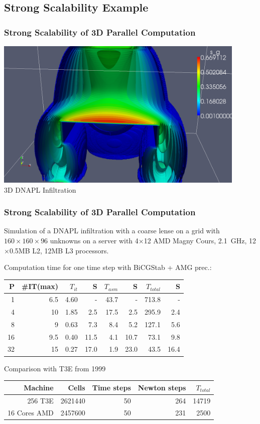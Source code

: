 \documentclass[aspectratio=169,11pt]{beamer}
\theoremstyle{definition}
\begin{document}
\subsection{Strong Scalability Example}
\begin{frame}
\frametitle<presentation>{Strong Scalability of 3D Parallel Computation}
\begin{center}
\includegraphics[width=0.9\textwidth]{dnapl-3d-het-iso}\\
3D DNAPL Infiltration
\end{center}
\end{frame}


\begin{frame}
\frametitle<presentation>{Strong Scalability of 3D Parallel Computation}
Simulation of a DNAPL infiltration with a coarse lense on a grid with  $160 \times 160 \times 96$
unknowns on a server with 4$\times$12  AMD Magny Cours, 2.1~GHz, 12$\times$0.5MB L2, 12MB
L3 processors.

Computation time for one time step with BiCGStab + AMG prec.:
\begin{center}
\begin{tabular}{r|rrr|rr|rr}
\hline
P  & \#IT(max) & $T_{it}$ & S & $T_{asm}$ & S & $T_{total}$ & S \\
\hline
 1  &  6.5 & 4.60 &      - &  43.7 &      - & 713.8 &    - \\
 4  &  10  & 1.85 &   2.5 &  17.5 &   2.5 & 295.9 & 2.4 \\
 8  &  9    & 0.63 &   7.3 &    8.4 &   5.2 & 127.1 & 5.6 \\
16 &  9.5 & 0.40 & 11.5 &    4.1 & 10.7 &   73.1 & 9.8 \\
32 &  15  & 0.27 & 17.0 &    1.9 & 23.0 &   43.5 & 16.4 \\
\hline
\end{tabular}
\end{center}

Comparison with T3E from 1999
\begin{center}
\begin{tabular}{r|rrrr}
\hline
Machine  & Cells & Time steps & Newton steps & $T_{total}$ \\
\hline
256 T3E        & 2621440 &  50 & 264 & 14719\\
16 Cores AMD & 2457600 & 50 & 231 & 2500\\
\hline
\end{tabular}
\end{center}
\vfill
\end{frame}
\end{document}
